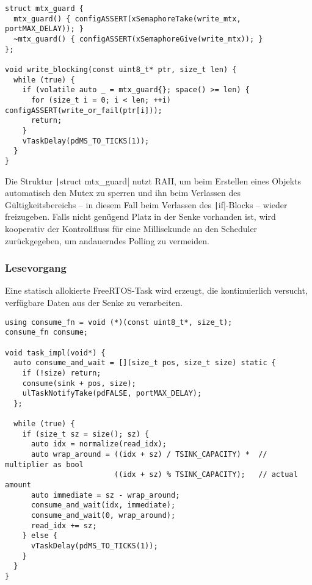 \begin{code}
\begin{verbatim}
struct mtx_guard {
  mtx_guard() { configASSERT(xSemaphoreTake(write_mtx, portMAX_DELAY)); }
  ~mtx_guard() { configASSERT(xSemaphoreGive(write_mtx)); }
};

void write_blocking(const uint8_t* ptr, size_t len) {
  while (true) {
    if (volatile auto _ = mtx_guard{}; space() >= len) {
      for (size_t i = 0; i < len; ++i) configASSERT(write_or_fail(ptr[i]));
      return;
    }
    vTaskDelay(pdMS_TO_TICKS(1));
  }
}
\end{verbatim}
\end{code}

Die Struktur \texttt|struct mtx_guard| nutzt \ac{RAII}, um beim
Erstellen eines Objekts automatisch den Mutex zu sperren und ihn beim Verlassen
des Gültigkeitsbereichs -- in diesem Fall beim Verlassen des
\texttt|if|-Blocks -- wieder freizugeben. Falls nicht genügend Platz in
der Senke vorhanden ist, wird kooperativ der Kontrollfluss für eine Millisekunde
an den Scheduler zurückgegeben, um andauerndes Polling zu vermeiden.

\subsubsection{Lesevorgang}

Eine statisch allokierte FreeRTOS-Task wird erzeugt, die kontinuierlich
versucht, verfügbare Daten aus der Senke zu verarbeiten.

\begin{code}
\begin{verbatim}
using consume_fn = void (*)(const uint8_t*, size_t);
consume_fn consume;

void task_impl(void*) {
  auto consume_and_wait = [](size_t pos, size_t size) static {
    if (!size) return;
    consume(sink + pos, size);
    ulTaskNotifyTake(pdFALSE, portMAX_DELAY);
  };

  while (true) {
    if (size_t sz = size(); sz) {
      auto idx = normalize(read_idx);
      auto wrap_around = ((idx + sz) / TSINK_CAPACITY) *  // multiplier as bool
                         ((idx + sz) % TSINK_CAPACITY);   // actual amount
      auto immediate = sz - wrap_around;
      consume_and_wait(idx, immediate);
      consume_and_wait(0, wrap_around);
      read_idx += sz;
    } else {
      vTaskDelay(pdMS_TO_TICKS(1));
    }
  }
}
\end{verbatim}
    \label{code:consumer_task}
\end{code}

